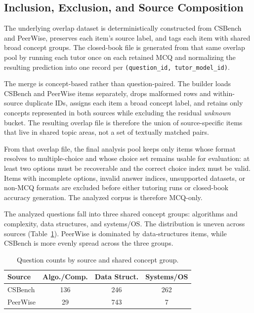 \documentclass[manuscript,review,anonymous]{acmart}
\begin{document}
\subsection{Inclusion, Exclusion, and Source Composition}

The underlying overlap dataset is deterministically constructed from CSBench and PeerWise, preserves each item's source label, and tags each item with shared broad concept groups. The closed-book file is generated from that same overlap pool by running each tutor once on each retained MCQ and normalizing the resulting prediction into one record per \texttt{(question\_id, tutor\_model\_id)}.

The merge is concept-based rather than question-paired. The builder loads CSBench and PeerWise items separately, drops malformed rows and within-source duplicate IDs, assigns each item a broad concept label, and retains only concepts represented in both sources while excluding the residual \emph{unknown} bucket. The resulting overlap file is therefore the union of source-specific items that live in shared topic areas, not a set of textually matched pairs.

From that overlap file, the final analysis pool keeps only items whose format resolves to multiple-choice and whose choice set remains usable for evaluation: at least two options must be recoverable and the correct choice index must be valid. Items with incomplete options, invalid answer indices, unsupported datasets, or non-MCQ formats are excluded before either tutoring runs or closed-book accuracy generation. The analyzed corpus is therefore MCQ-only.

The analyzed questions fall into three shared concept groups: algorithms and complexity, data structures, and systems/OS. The distribution is uneven across sources (Table~\ref{tab:concepts}). PeerWise is dominated by data-structures items, while CSBench is more evenly spread across the three groups.

\begin{table}[t]
\caption{Question counts by source and shared concept group.}
\label{tab:concepts}
\small
\centering
\begin{tabular}{@{}lccc@{}}
\toprule
Source & Algo./Comp. & Data Struct. & Systems/OS \\
\midrule
CSBench & 136 & 246 & 262 \\
PeerWise & 29 & 743 & 7 \\
\bottomrule
\end{tabular}
\end{table}
\end{document}
